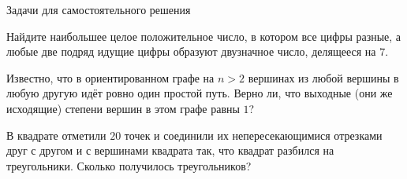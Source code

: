 \begin{frame}{Задачи для самостоятельного решения}



\z Найдите наибольшее целое положительное число, в котором все цифры разные, а любые две подряд идущие цифры образуют двузначное
число, делящееся на $7$.



\z Известно, что в ориентированном графе на $n> 2$ вершинах из любой
вершины в любую другую идёт ровно один простой путь. Верно ли, что
выходные (они же исходящие) степени вершин в этом графе равны $1$?

\z В квадрате отметили $20$ точек и соединили их непересекающимися отрезками друг с другом и с вершинами квадрата так, что квадрат разбился на треугольники. Сколько получилось треугольников?

\end{frame}









